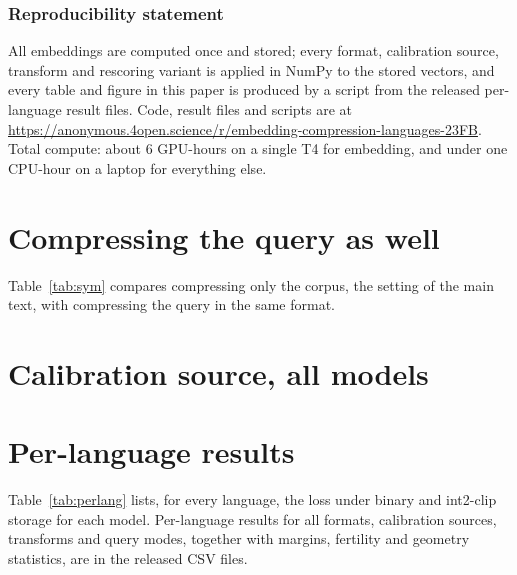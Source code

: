 \documentclass[10pt]{article}
\begin{document}
\subsubsection*{Reproducibility statement}
All embeddings are computed once and stored; every format, calibration source, transform and rescoring variant is applied in NumPy to the stored vectors, and every table and figure in this paper is produced by a script from the released per-language result files. Code, result files and scripts are at \url{https://anonymous.4open.science/r/embedding-compression-languages-23FB}. Total compute: about 6 GPU-hours on a single T4 for embedding, and under one CPU-hour on a laptop for everything else.




\appendix
\section{Compressing the query as well}\label{app:sym}

Table~\ref{tab:sym} compares compressing only the corpus, the setting of the main text, with compressing the query in the same format.

\section{Calibration source, all models}\label{app:calib}


\section{Per-language results}\label{app:perlang}
Table~\ref{tab:perlang} lists, for every language, the loss under binary and int2-clip storage for each model. Per-language results for all formats, calibration sources, transforms and query modes, together with margins, fertility and geometry statistics, are in the released CSV files.

\end{document}
